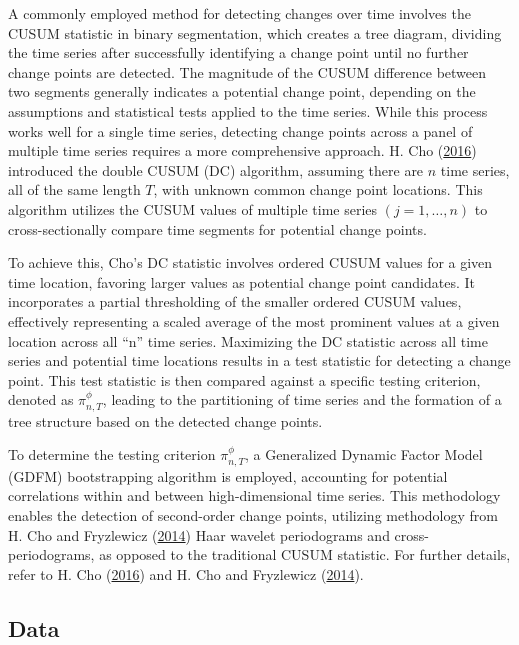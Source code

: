 \documentclass[
  12pt,
]{article}
\begin{document}
A commonly employed method for detecting changes over time involves the
CUSUM statistic in binary segmentation, which creates a tree diagram,
dividing the time series after successfully identifying a change point
until no further change points are detected. The magnitude of the CUSUM
difference between two segments generally indicates a potential change
point, depending on the assumptions and statistical tests applied to the
time series. While this process works well for a single time series,
detecting change points across a panel of multiple time series requires
a more comprehensive approach. H. Cho
(\protect\hyperlink{ref-Cho2016}{2016}) introduced the double CUSUM (DC)
algorithm, assuming there are \(n\) time series, all of the same length
\(T\), with unknown common change point locations. This algorithm
utilizes the CUSUM values of multiple time series \((j = 1, \dots, n)\)
to cross-sectionally compare time segments for potential change points.

To achieve this, Cho's DC statistic involves ordered CUSUM values for a
given time location, favoring larger values as potential change point
candidates. It incorporates a partial thresholding of the smaller
ordered CUSUM values, effectively representing a scaled average of the
most prominent values at a given location across all ``n'' time series.
Maximizing the DC statistic across all time series and potential time
locations results in a test statistic for detecting a change point. This
test statistic is then compared against a specific testing criterion,
denoted as \(\pi_{n,T}^\phi\), leading to the partitioning of time
series and the formation of a tree structure based on the detected
change points.

To determine the testing criterion \(\pi_{n,T}^\phi\), a Generalized
Dynamic Factor Model (GDFM) bootstrapping algorithm is employed,
accounting for potential correlations within and between
high-dimensional time series. This methodology enables the detection of
second-order change points, utilizing methodology from H. Cho and
Fryzlewicz (\protect\hyperlink{ref-ChoFryzlewwicz2014}{2014}) Haar
wavelet periodograms and cross-periodograms, as opposed to the
traditional CUSUM statistic. For further details, refer to H. Cho
(\protect\hyperlink{ref-Cho2016}{2016}) and H. Cho and Fryzlewicz
(\protect\hyperlink{ref-ChoFryzlewwicz2014}{2014}).

\hypertarget{data}{%
\subsection{Data}\label{data}}
\end{document}
